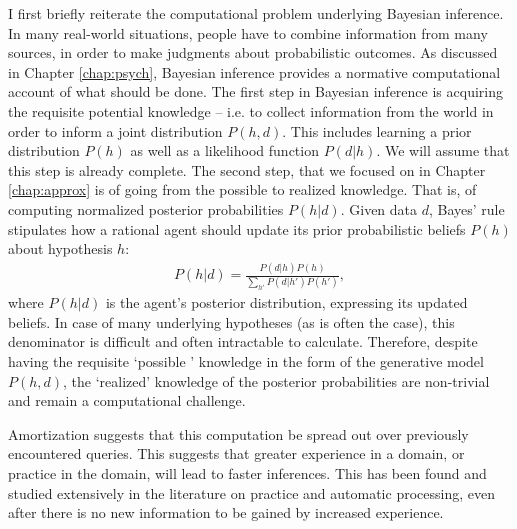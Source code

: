 
I first briefly reiterate the computational problem underlying Bayesian inference. In many real-world situations, people have to combine information from many sources, in order to make judgments about probabilistic outcomes. As discussed in Chapter \ref{chap:psych}, Bayesian inference provides a normative computational account of what should be done. The first step in Bayesian inference is acquiring the requisite potential knowledge  -- i.e. to collect information from the world in order to inform a joint distribution $P(h,d)$. This includes learning a prior distribution $P(h)$ as well as a likelihood function $P(d | h)$. We will assume that this step is already complete. The second step, that we focused on in Chapter \ref{chap:approx} is of going from the possible to realized knowledge. That is, of computing normalized posterior probabilities  $P(h |d)$. Given data $d$, Bayes' rule stipulates how a rational agent should update its prior probabilistic beliefs $P(h)$ about hypothesis $h$:
\begin{align}
    P(h|d) = \frac{P(d|h)P(h)}{\sum_{h'} P(d|h') P(h')},
\end{align}
where $P(h|d)$ is the agent's posterior distribution, expressing its updated beliefs. In case of many underlying hypotheses (as is often the case), this denominator is difficult and often intractable to calculate. Therefore, despite having the requisite `possible ' knowledge in the form of the generative model $P(h,d)$, the `realized' knowledge of the posterior probabilities are non-trivial and remain a computational challenge.

Amortization suggests that this computation be spread out over previously encountered queries. This suggests that greater experience in a domain, or practice in the domain, will lead to faster inferences. This has been found and studied extensively in the literature on practice\citep{gobet2001chunking, newell1981mechanisms} and automatic processing\citep{shiffrin1977controlled, logan1988toward}, even after there is no new information to be gained by increased experience. 

